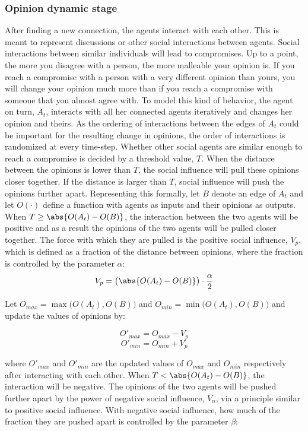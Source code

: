 \documentclass[11pt]{article}
\DeclarePairedDelimiter{\abs}\lvert\rvert
\begin{document}
\subsubsection{Opinion dynamic stage}
After finding a new connection, the agents interact with each other. This is meant to represent discussions or other social interactions between agents. 
Social interactions between similar individuals will lead to compromises.
Up to a point, the more you disagree with a person, the more malleable your opinion is. If you reach a compromise with a person with a very different opinion than yours, you will change your opinion much more than if you reach a compromise with someone that you almost agree with. 
To model this kind of behavior, the agent on turn, $A_t$, interacts with all her connected agents iteratively and changes her opinion and theirs. 
As the ordering of interactions between the edges of $A_t$ could be important for the resulting change in opinions, the order of interactions is randomized at every time-step. Whether other social agents are similar enough to reach a compromise is decided by a threshold value, $T$. When the distance between the opinions is lower than $T$, the social influence will pull these opinions closer together. If the distance is larger than $T$, social influence will push the opinions further apart.
Representing this formally, let $B$ denote an edge of $A_t$ and let $O(\cdot)$ define a function with agents as inputs and their opinions as outputs.
When $T \geq \abs{O(A_t) - O(B)}$, the interaction between the two agents will be positive and as a result the opinions of the two agents will be pulled closer together. The force with which they are pulled is the positive social influence, $V_p$, which is defined as a fraction of the distance between opinions, where the fraction is controlled by the parameter $\alpha$:
$$V_p = \big(\abs{O(A_t) - O(B)}\big) \cdot \frac{\alpha}{2}$$

Let $O_{max} = \max \big(O(A_t), O(B)\big)$ and $O_{min} = \min \big(O(A_t), O(B)\big)$ and update the values of opinions by:

$$O'_{max} = O_{max} - V_p$$
$$O'_{min} = O_{min} + V_p$$

where $O'_{max}$ and $O'_{min}$ are the updated values of $O_{max}$ and $O_{min}$ respectively after interacting with each other. When $T < \abs{O(A_t) - O(B)}$, the interaction will be negative. The opinions of the two agents will be pushed further apart by the power of negative social influence, $V_n$, via a principle similar to positive social influence. With negative social influence, how much of the fraction they are pushed apart is controlled by the parameter $\beta$: 
\end{document}
